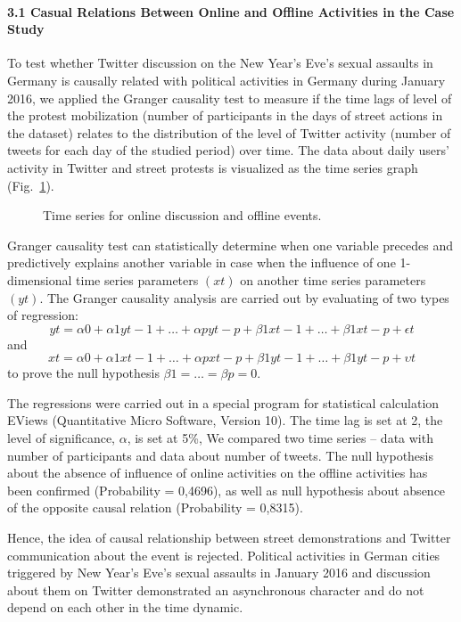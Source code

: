 \paragraph{3.1 Casual Relations Between Online and Offline Activities in the Case Study} 
To test whether Twitter discussion on the New Year’s Eve’s sexual assaults in Germany is causally related with political activities in Germany during January 2016, we applied the Granger causality test to measure if the time lags of level of the protest mobilization (number of participants in the days of street actions in the dataset) relates to the distribution of the level of Twitter activity (number of tweets for each day of the studied period) over time. The data about daily users’ activity in Twitter and street protests is visualized as the time series graph (Fig.~\cref{fig:onlineDiscussionTimeSeries}).

\begin{figure}[ht]
	\caption{Time series for online discussion and offline events.}\label{fig:onlineDiscussionTimeSeries}
\end{figure}

Granger causality test can statistically determine when one variable precedes and predictively explains another variable \cite{GroshekCloughGroshek} in case when the influence of one 1-dimensional time series parameters \((xt)\) on another time series parameters \((yt)\). The Granger causality analysis are carried out by evaluating of two types of regression:
\[ 
yt = \alpha0 + \alpha1yt - 1 + \ldots + \alpha p yt - p + \beta1xt - 1 + \ldots + \beta1xt - p + \epsilon t
\] and
\[ 
xt = \alpha0 + \alpha1xt - 1 + \ldots + \alpha p xt - p + \beta1yt - 1 + \ldots + \beta1yt - p + \upsilon t
\]
to prove the null hypothesis \(\beta1 = \ldots = \beta p = 0\).

The regressions were carried out in a special program for statistical calculation EViews (Quantitative Micro Software, Version 10). The time lag is set at 2, the level of significance, \(\alpha\), is set at 5\%, We compared two time series -- data with number of participants and data about number of tweets. The null hypothesis about the absence of influence of online activities on the offline activities has been confirmed (Probability = 0,4696), as well as null hypothesis about absence of the opposite causal relation (Probability = 0,8315).

Hence, the idea of causal relationship between street demonstrations and Twitter communication about the event is rejected. Political activities in German cities triggered by New Year’s Eve’s sexual assaults in January 2016 and discussion about them on Twitter demonstrated an asynchronous character and do not depend on each other in the time dynamic.


